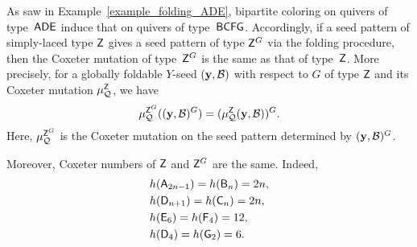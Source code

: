 \begin{remark}\label{remark:folding and Coxeter mutation}
As saw in Example~\ref{example_folding_ADE}, bipartite coloring 
on quivers of type~$\mathsf{ADE}$ induce that on quivers of type~$\mathsf{BCFG}$.
Accordingly, if a seed pattern of simply-laced type $\mathsf{Z}$ 
gives a seed pattern of type ${\mathsf{Z}^G}$ via the folding procedure, then
the Coxeter mutation of type~${\mathsf{Z}^G}$ is the same as
that of type~$\mathsf{Z}$. 
More precisely, for a globally foldable $Y$-seed $(\mathbf{y},\mathcal{B})$ with respect to $G$ 
of type $\mathsf{Z}$ and its Coxeter mutation $\mu_{\mathcal{Q}}^{\mathsf{Z}}$, we have
\[
 \mu_{\mathcal{Q}}^{{\mathsf{Z}^G}}((\mathbf{y},\mathcal{B})^G) = (\mu_{\mathcal{Q}}^{\mathsf{Z}}(\mathbf{y},\mathcal{B}))^G.
\]
Here,  $\mu_{\mathcal{Q}}^{{\mathsf{Z}^G}}$ is the Coxeter mutation on 
the seed pattern determined by $(\mathbf{y},\mathcal{B})^G$.


Moreover, Coxeter numbers of $\mathsf{Z}$
and ${\mathsf{Z}^G}$ are the same. Indeed, 
\[
\begin{split}
& h(\mathsf{A}_{2n-1}) = h (\mathsf{B}_n) = 2n, \\
& h(\mathsf{D}_{n+1}) = h(\mathsf{C}_n) = 2n, \\
& h(\mathsf{E}_6) = h(\mathsf{F}_4) = 12, \\
& h(\mathsf{D}_4) = h(\mathsf{G}_2) = 6.
\end{split}
\]
\end{remark}

